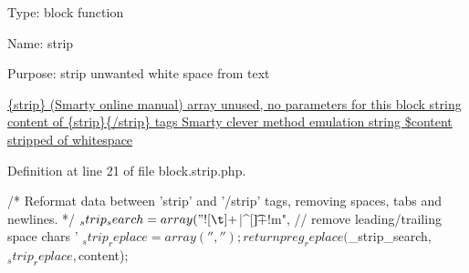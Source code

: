 \-Type\-: block function\par
 \-Name\-: strip\par
 \-Purpose\-: strip unwanted white space from text\par
 \hyperlink{}{\{strip\} (\-Smarty online manual)  array unused, no parameters for this block  string content of \{strip\}\{/strip\} tags  \-Smarty clever method emulation  string \$content stripped of whitespace }

\-Definition at line 21 of file block.\-strip.\-php.


\begin{DoxyCode}
{
        /* Reformat data between 'strip' and '/strip' tags, removing spaces,
       tabs and newlines. */
        $_strip_search = array(
                "![\t ]+$|^[\t ]+!m", // remove leading/trailing space chars
                '%
        $_strip_replace = array(
                '',
                '');
        return preg_replace($_strip_search, $_strip_replace, $content);
}
\end{DoxyCode}
